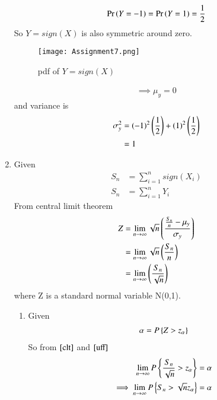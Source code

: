 \documentclass[journal,12pt,twocolumn]{IEEEtran}
\begin{document}
\begin{enumerate}
\begin{align}
   \Pr\left(Y=-1\right)=\Pr\left(Y=1\right)=\frac{1}{2} 
\end{align}
So $Y=sign(X)$ is also symmetric around zero.
\begin{figure}[!ht]
\centering
\texttt{[image: Assignment7.png]}
\caption{pdf of $ Y=sign(X)$}
\label{pdf}
\end{figure}
\begin{align}
   \implies \mu_y = 0 
\end{align}
and variance is
\begin{align}
    \sigma_y^2 &= (-1)^2\left(\frac{1}{2}\right)+(1)^2\left(\frac{1}{2}\right)\\
    &=1
\end{align}
\item Given
\begin{align}
    S_n&=\sum_{i=1}^{n} sign(X_i)\\
    S_n&=\sum_{i=1}^{n} Y_i
\end{align}
From central limit theorem 
\begin{align}
    Z&=\lim_{n\to\infty}\sqrt{n}\left(\frac{\frac{S_n}{n}-\mu_y}{\sigma_y}\right)\\
    &=\lim_{n\to\infty}\sqrt{n}\left(\frac{S_n}{n}\right)\\
    &=\lim_{n\to\infty}\left(\frac{S_n}{\sqrt{n}}\right)
    \label{clt}
\end{align}
where Z is a standard normal variable N(0,1).
\begin{enumerate}
    \item Given
\begin{align}
    \alpha = P\left\{Z>z_\alpha\right\}\label{uff}
\end{align}
So from $\eqref{clt}$ and $\eqref{uff}$
\begin{align}
\lim_{n\to\infty}P\left\{\frac{S_n}{\sqrt{n}}>z_\alpha\right\}&=
\alpha\\
\implies \lim_{n\to\infty}P\left\{S_n>\sqrt{n}z_\alpha\right\}&=
\alpha
\end{align}
\end{enumerate}
\end{enumerate}
\end{document}

